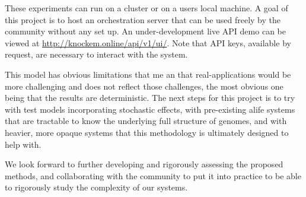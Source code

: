 These experiments can run on a cluster or on a users local machine.
A goal of this project is to host an orchestration server that can be used freely by the community without any set up.
An under-development live API demo can be viewed at \url{http://knockem.online/api/v1/ui/}.
Note that API keys, available by request, are necessary to interact with the system.

This model has obvious limitations that me  an that real-applications would be more challenging and does not reflect those challenges, the most obvious one being that the results are deterministic.
The next steps for this project is to try with test models incorporating stochastic effects, with pre-existing alife systems that are tractable to know the underlying full structure of genomes, and with heavier, more opaque systems that this methodology is ultimately designed to help with.

We look forward to further developing and rigorously assessing the proposed methods, and collaborating with the community to put it into practice to be able to rigorously study the complexity of our systems.

